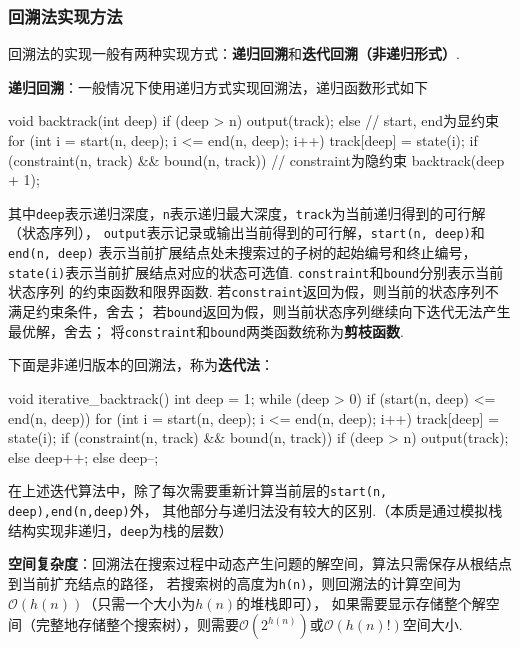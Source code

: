 \documentclass[12pt, a4paper, oneside]{ctexart}
\numberwithin{equation}{section}  %
\theoremstyle{definition}
\def\O{\mathcal{O}}         %
\begin{document}
\subsubsection{回溯法实现方法}
回溯法的实现一般有两种实现方式：\textbf{递归回溯}和\textbf{迭代回溯（非递归形式）}.

\textbf{递归回溯}：一般情况下使用递归方式实现回溯法，递归函数形式如下
\begin{cppcode}
void backtrack(int deep) {
    if (deep > n) output(track);
    else {  // start, end为显约束
        for (int i = start(n, deep); i <= end(n, deep); i++) {
            track[deep] = state(i);
            if (constraint(n, track) && bound(n, track))  // constraint为隐约束
                backtrack(deep + 1);
        }
    }
}
\end{cppcode}
其中\texttt{deep}表示递归深度，\texttt{n}表示递归最大深度，\texttt{track}为当前递归得到的可行解（状态序列），
\texttt{output}表示记录或输出当前得到的可行解，\texttt{start(n, deep)}和\texttt{end(n, deep)}
表示当前扩展结点处未搜索过的子树的起始编号和终止编号，\texttt{state(i)}表示当前扩展结点对应的状态可选值.
\texttt{constraint}和\texttt{bound}分别表示当前状态序列
的约束函数和限界函数. 若\texttt{constraint}返回为假，则当前的状态序列不满足约束条件，舍去；
若\texttt{bound}返回为假，则当前状态序列继续向下迭代无法产生最优解，舍去；
将\texttt{constraint}和\texttt{bound}两类函数统称为\textbf{剪枝函数}.

下面是非递归版本的回溯法，称为\textbf{迭代法}：
\begin{cppcode}
void iterative_backtrack() {
    int deep = 1;
    while (deep > 0) {
        if (start(n, deep) <=  end(n, deep)) {
            for (int i = start(n, deep); i <= end(n, deep); i++) {
                track[deep] = state(i);
                if (constraint(n, track) && bound(n, track)) {
                    if (deep > n) output(track);
                    else deep++;
                }
            }
        } else deep--;
    }
}
\end{cppcode}
在上述迭代算法中，除了每次需要重新计算当前层的\texttt{start(n, deep),end(n,deep)}外，
其他部分与递归法没有较大的区别.（本质是通过模拟栈结构实现非递归，\texttt{deep}为栈的层数）

\textbf{空间复杂度}：回溯法在搜索过程中动态产生问题的解空间，算法只需保存从根结点到当前扩充结点的路径，
若搜索树的高度为\texttt{h(n)}，则回溯法的计算空间为$\O(h(n))$（只需一个大小为$h(n)$的堆栈即可），
如果需要显示存储整个解空间（完整地存储整个搜索树），则需要$\O(2^{h(n)})$或$\O(h(n)!)$空间大小.
\end{document}
